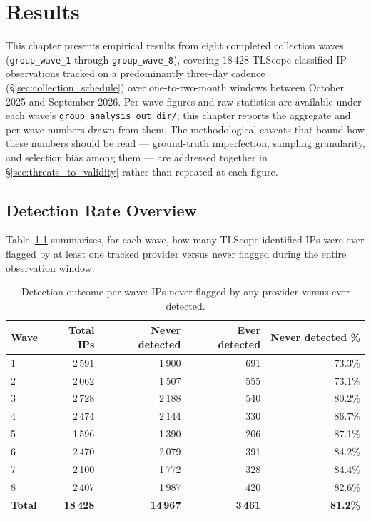 \documentclass[12pt, a4paper, twoside]{report}
\begin{document}
\chapter{Results}
\label{ch:results}

This chapter presents empirical results from eight completed collection waves
(\texttt{group\_wave\_1} through \texttt{group\_wave\_8}), covering 18\,428 TLScope-classified IP
observations tracked on a predominantly three-day cadence (\S\ref{sec:collection_schedule}) over
one-to-two-month windows between October 2025 and
September 2026. Per-wave figures and raw statistics are available under each wave's
\texttt{group\_analysis\_out\_dir/}; this chapter reports the aggregate and per-wave numbers drawn
from them. The methodological caveats that bound how these numbers should be read --- ground-truth
imperfection, sampling granularity, and selection bias among them --- are addressed together in
\S\ref{sec:threats_to_validity} rather than repeated at each figure.

\section{Detection Rate Overview}

Table~\ref{tab:detection_overview} summarises, for each wave, how many TLScope-identified IPs were
ever flagged by at least one tracked provider versus never flagged during the entire observation
window.

\begin{table}[h]
  \centering
  \caption{Detection outcome per wave: IPs never flagged by any provider versus ever detected.}
  \label{tab:detection_overview}
  \begin{tabular}{lrrrr}
    \toprule
    \textbf{Wave} & \textbf{Total IPs} & \textbf{Never detected} & \textbf{Ever detected} & \textbf{Never detected \%} \\
    \midrule
    1 & 2\,591 & 1\,900 & 691 & 73.3\% \\
    2 & 2\,062 & 1\,507 & 555 & 73.1\% \\
    3 & 2\,728 & 2\,188 & 540 & 80.2\% \\
    4 & 2\,474 & 2\,144 & 330 & 86.7\% \\
    5 & 1\,596 & 1\,390 & 206 & 87.1\% \\
    6 & 2\,470 & 2\,079 & 391 & 84.2\% \\
    7 & 2\,100 & 1\,772 & 328 & 84.4\% \\
    8 & 2\,407 & 1\,987 & 420 & 82.6\% \\
    \midrule
    \textbf{Total} & \textbf{18\,428} & \textbf{14\,967} & \textbf{3\,461} & \textbf{81.2\%} \\
    \bottomrule
  \end{tabular}
\end{table}
\end{document}
